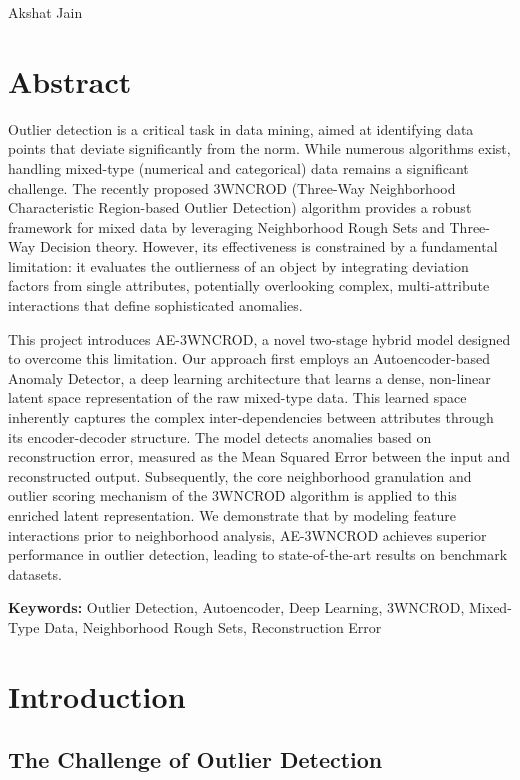 \documentclass[12pt,a4paper]{article}
\begin{document}
Akshat Jain

\newpage

\section*{Abstract}

Outlier detection is a critical task in data mining, aimed at identifying data points that deviate significantly from the norm. While numerous algorithms exist, handling mixed-type (numerical and categorical) data remains a significant challenge. The recently proposed 3WNCROD (Three-Way Neighborhood Characteristic Region-based Outlier Detection) algorithm provides a robust framework for mixed data by leveraging Neighborhood Rough Sets and Three-Way Decision theory. However, its effectiveness is constrained by a fundamental limitation: it evaluates the outlierness of an object by integrating deviation factors from single attributes, potentially overlooking complex, multi-attribute interactions that define sophisticated anomalies.

This project introduces AE-3WNCROD, a novel two-stage hybrid model designed to overcome this limitation. Our approach first employs an Autoencoder-based Anomaly Detector, a deep learning architecture that learns a dense, non-linear latent space representation of the raw mixed-type data. This learned space inherently captures the complex inter-dependencies between attributes through its encoder-decoder structure. The model detects anomalies based on reconstruction error, measured as the Mean Squared Error between the input and reconstructed output. Subsequently, the core neighborhood granulation and outlier scoring mechanism of the 3WNCROD algorithm is applied to this enriched latent representation. We demonstrate that by modeling feature interactions prior to neighborhood analysis, AE-3WNCROD achieves superior performance in outlier detection, leading to state-of-the-art results on benchmark datasets.

\textbf{Keywords:} Outlier Detection, Autoencoder, Deep Learning, 3WNCROD, Mixed-Type Data, Neighborhood Rough Sets, Reconstruction Error

\newpage

\tableofcontents
\newpage

\section{Introduction}

\subsection{The Challenge of Outlier Detection}
\end{document}
